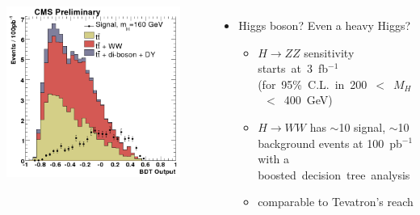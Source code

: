 \documentclass[compress]{beamer}
\begin{document}
\begin{frame}
\vspace{-0.8 cm}
\begin{columns}
\includegraphics[width=1.333\linewidth]{Higgs_WW_100pb-1.png}


\mbox{ }

\begin{itemize}
\item Higgs boson?  Even a heavy Higgs?
\begin{itemize}\setlength{\itemsep}{0.1 cm}
\item $H \to ZZ$ sensitivity \mbox{starts at 3~fb$^{-1}$\hspace{-1 cm}} \\ \mbox{\scriptsize (for 95\% C.L. in 200 $<$ $M_H$ $<$ 400~GeV)\hspace{-1 cm}}
\item $H \to WW$ has $\sim$10 signal, $\sim$10 background events at 100~pb$^{-1}$ with a \mbox{boosted decision tree analysis\hspace{-1 cm}}
\item comparable to Tevatron's reach
\end{itemize}
\end{itemize}
\end{columns}
\label{discoveries_in_standard_model}
\end{frame}
\end{document}
